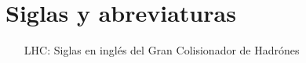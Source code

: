 \section{Siglas y abreviaturas }
\begin{itemize}
\item[LHC:] Siglas en inglés del Gran Colisionador de Hadrónes
\end{itemize}









